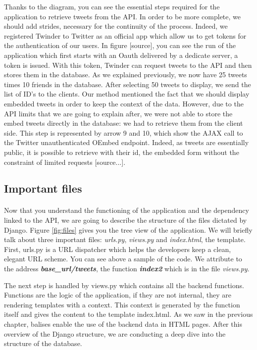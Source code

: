 Thanks to the diagram, you can see the essential steps required for the application to retrieve tweets from the API. In order to be more complete, we should add strides, necessary for the continuity of the process. Indeed, we registered Twinder to Twitter as an official app which allow us to get tokens for the authentication of our users. In figure [source], you can see the run of the application which first starts with an Oauth delivered by a dedicate server, a token is issued. With this token, Twinder can request tweets to the API and then stores them in the database. As we explained previously, we now have 25 tweets times 10 friends in the database. After selecting 50 tweets to display, we send the list of ID's to the clients. Our method mentioned the fact that we should display embedded tweets in order to keep the context of the data. However, due to the API limits that we are going to explain after, we were not able to store the embed tweets directly in the database: we had to retrieve them from the client side. This step is represented by arrow 9 and 10, which show the AJAX call to the Twitter unauthenticated OEmbed endpoint. Indeed, as tweets are essentially public, it is possible to retrieve with their id, the embedded form without the constraint  of limited requests [source...].\\

\subsection{Important files}

\paragraph{}
Now that you understand the functioning of the application and the dependency linked to the API, we are going to describe the structure of the files dictated by Django. Figure \ref{fig:files} gives you the tree view of the application. We will briefly talk about three important files:  \textit{urls.py},  \textit{views.py} and  \textit{index.html}, the template. First, urls.py is a URL dispatcher which helps the developers keep a clean, elegant URL scheme. You can see above a sample of the code. We attribute to the address \textbf{\textit{base\_url/tweets}}, the function \textbf{\textit{index2}} which is in the file \textit{views.py}. 

 

The next step is handled by views.py which contains all the backend functions. Functions are the logic of the application, if they are not internal, they are rendering templates with a context. This context is generated by the function itself and gives the content to the template index.html. As we saw in the previous chapter, balises enable the use of the backend data in HTML pages. After this overview of the Django structure, we are conducting a deep dive into the structure of the database. \\\\

